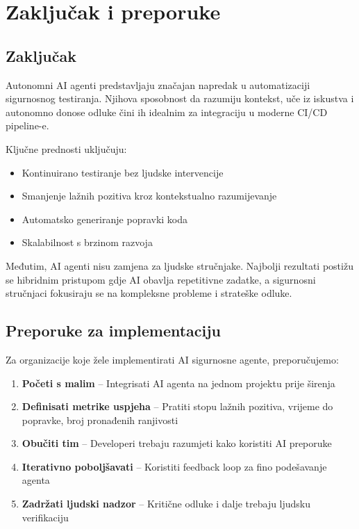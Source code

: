 \documentclass[12pt,a4paper]{article}
\begin{document}
\section{Zaključak i preporuke}

\subsection{Zaključak}

Autonomni AI agenti predstavljaju značajan napredak u automatizaciji sigurnosnog testiranja. Njihova sposobnost da razumiju kontekst, uče iz iskustva i autonomno donose odluke čini ih idealnim za integraciju u moderne CI/CD pipeline-e.

Ključne prednosti uključuju:
\begin{itemize}
    \item Kontinuirano testiranje bez ljudske intervencije
    \item Smanjenje lažnih pozitiva kroz kontekstualno razumijevanje
    \item Automatsko generiranje popravki koda
    \item Skalabilnost s brzinom razvoja
\end{itemize}

Međutim, AI agenti nisu zamjena za ljudske stručnjake. Najbolji rezultati postižu se hibridnim pristupom gdje AI obavlja repetitivne zadatke, a sigurnosni stručnjaci fokusiraju se na kompleksne probleme i strateške odluke.

\subsection{Preporuke za implementaciju}

Za organizacije koje žele implementirati AI sigurnosne agente, preporučujemo:

\begin{enumerate}
    \item \textbf{Početi s malim} -- Integrisati AI agenta na jednom projektu prije širenja
    \item \textbf{Definisati metrike uspjeha} -- Pratiti stopu lažnih pozitiva, vrijeme do popravke, broj pronađenih ranjivosti
    \item \textbf{Obučiti tim} -- Developeri trebaju razumjeti kako koristiti AI preporuke
    \item \textbf{Iterativno poboljšavati} -- Koristiti feedback loop za fino podešavanje agenta
    \item \textbf{Zadržati ljudski nadzor} -- Kritične odluke i dalje trebaju ljudsku verifikaciju
\end{enumerate}
\end{document}
